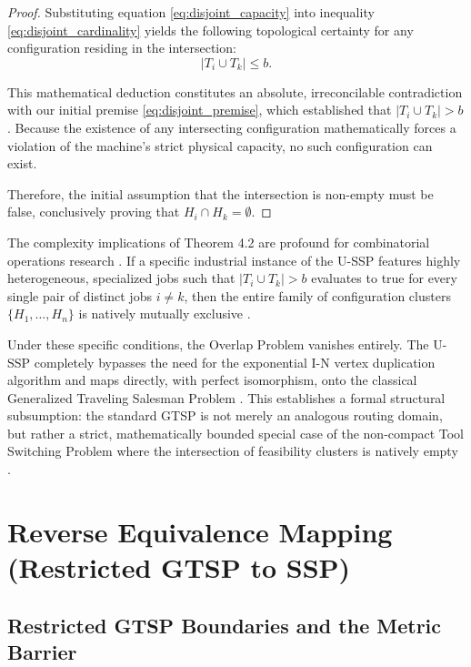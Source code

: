 \documentclass[11pt, a4paper]{book}
\begin{document}
\begin{proof}
		Substituting equation \eqref{eq:disjoint_capacity} into inequality \eqref{eq:disjoint_cardinality} yields the following topological certainty for any configuration residing in the intersection:
		\begin{equation}
			|T_i \cup T_k| \le b.
		\end{equation}
		
		This mathematical deduction constitutes an absolute, irreconcilable contradiction with our initial premise \eqref{eq:disjoint_premise}, which established that $|T_i \cup T_k| > b$. Because the existence of any intersecting configuration mathematically forces a violation of the machine's strict physical capacity, no such configuration can exist. 
		
		Therefore, the initial assumption that the intersection is non-empty must be false, conclusively proving that $H_i \cap H_k = \emptyset$.
	\end{proof}
	
	The complexity implications of Theorem 4.2 are profound for combinatorial operations research %
	. If a specific industrial instance of the U-SSP features highly heterogeneous, specialized jobs such that $|T_i \cup T_k| > b$ evaluates to true for every single pair of distinct jobs $i \neq k$, then the entire family of configuration clusters $\{H_1, \dots, H_n\}$ is natively mutually exclusive %
	. 
	
	Under these specific conditions, the Overlap Problem vanishes entirely. The U-SSP completely bypasses the need for the exponential I-N vertex duplication algorithm and maps directly, with perfect isomorphism, onto the classical Generalized Traveling Salesman Problem %
	. This establishes a formal structural subsumption: the standard GTSP is not merely an analogous routing domain, but rather a strict, mathematically bounded special case of the non-compact Tool Switching Problem where the intersection of feasibility clusters is natively empty %
	.
	
	
	\section{Reverse Equivalence Mapping (Restricted GTSP to SSP)}
	
	\subsection{Restricted GTSP Boundaries and the Metric Barrier}
	
\end{document}
